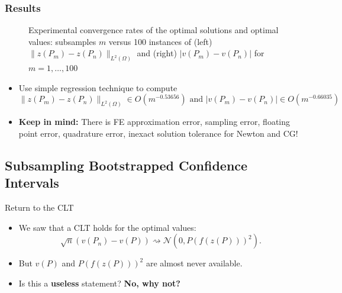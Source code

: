 \documentclass[aspectratio=169,xcolor=dvipsnames,10pt]{beamer}
\begin{document}
\begin{frame}\frametitle{Results}
\begin{figure}
\qquad
{}
\caption{Experimental convergence rates of the optimal solutions and optimal values:  subsamples $m$ versus 100 instances of
(left) $\|z(P_m) - z(P_n)\|_{L^2(\Omega)}$ and
(right) $|v(P_m) - v(P_n)|$ for $m = 1,\dots,100$
\label{fig:fig3}}
\end{figure}
\begin{exampleblock}{}
    \begin{itemize}
        \item Use simple regression technique to compute
        \[
        \|z(P_m) - z(P_n)\|_{L^2(\Omega)} \in O(m^{-0.53656})
        \text{ and }
        |v(P_m) - v(P_n)| \in O(m^{-0.66035})
        \]
        \item \textbf{Keep in mind:} There is FE approximation error, sampling error, floating point error, quadrature error, inexact solution tolerance for Newton and CG! 
    \end{itemize}    
\end{exampleblock}
\end{frame}

\subsection{Subsampling Bootstrapped Confidence Intervals}
\begin{frame}{Return to the CLT}
    \begin{exampleblock}{}
        \begin{itemize}
            \item We saw that a CLT holds for the optimal values:
            \[
            \sqrt{n}(v(P_{n})-v(P)) \rightsquigarrow \mathcal{N}(0,P(f(z(P)))^2).
            \]
            \item But $v(P)$ and $P(f(z(P)))^2$ are \alert{almost never available.}
            \item Is this a \textbf{useless} statement? \textbf{No, why not?}
        \end{itemize}
    \end{exampleblock}
\end{frame}
\end{document}
